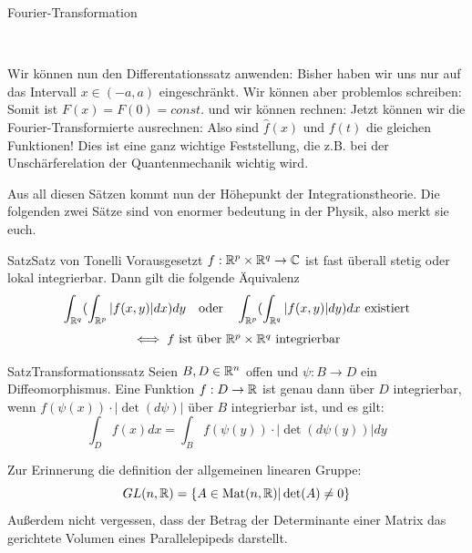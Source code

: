 \begin{Beispiel}{Fourier-Transformation}
\begin{enumerate}
     \\
\end{enumerate}
Wir können nun den Differentationssatz anwenden:
Bisher haben wir uns nur auf das Intervall $x\in(-a,a)$ eingeschränkt. Wir können aber problemlos schreiben:
Somit ist $F(x)=F(0)=const.$ und wir können rechnen:
Jetzt können wir die Fourier-Transformierte ausrechnen:
Also sind $\hat{f}(x)$ und $f(t)$ die gleichen Funktionen! Dies ist eine ganz wichtige Feststellung, die z.B. bei der Unschärferelation der Quantenmechanik wichtig wird.
\end{Beispiel}
\newpage
Aus all diesen Sätzen kommt nun der Höhepunkt der Integrationstheorie. Die folgenden zwei Sätze sind von enormer bedeutung in der Physik, also merkt sie euch. 
\begin{Satz}{Satz}{Satz von Tonelli}
    Vorausgesetzt $f:\mathbb{R}^p\times \mathbb{R}^q \rightarrow \mathbb{C}$ ist fast überall stetig oder lokal integrierbar. Dann gilt die folgende Äquivalenz
    $$\int_{\mathbb{R}^q}(\int_{\mathbb{R}^p} |f(x,y)|dx)dy \quad\mbox{oder}\quad\int_{\mathbb{R}^p}(\int_{\mathbb{R}^q} |f(x,y)|dy)dx\mbox{ existiert} $$
    $$\iff \mbox{$f$ ist über $\mathbb{R}^p\times\mathbb{R}^q$ integrierbar}$$
\end{Satz}
\begin{Satz}{Satz}{Transformationssatz}
Seien $B,D\in\mathbb{R}^n$ offen und $\psi: B\rightarrow D$ ein Diffeomorphismus. Eine Funktion $f: D\rightarrow \mathbb{R}$ ist genau dann über $D$ integrierbar, wenn $f(\psi(x))\cdot|\det(d\psi)|$ über $B$ integrierbar ist, und es gilt:
$$\int_D f(x) dx = \int_B f(\psi(y))\cdot|\det(d\psi(y))|dy$$
\end{Satz}
Zur Erinnerung die definition der allgemeinen linearen Gruppe: $$GL(n,\mathbb{R})=\{A\in \mbox{Mat}(n,\mathbb{R})| \det(A)\neq0\}$$
Außerdem nicht vergessen, dass der Betrag der Determinante einer Matrix das gerichtete Volumen eines Parallelepipeds darstellt.
